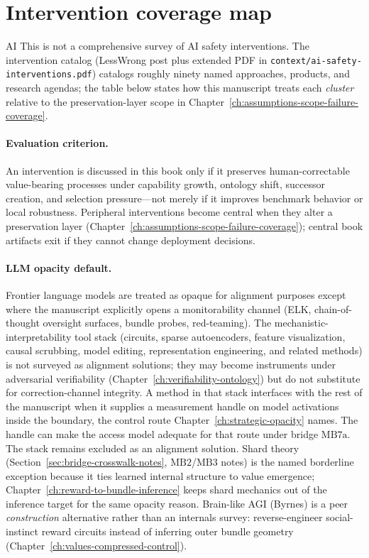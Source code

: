 \section{Intervention coverage map}
\label{sec:intervention-coverage-map}
\begin{authbar}{AI}
This is not a comprehensive survey of AI safety interventions.
The intervention catalog \autocite{zarncke2025interventions} (LessWrong post plus extended PDF in \texttt{context/ai-safety-interventions.pdf}) catalogs roughly ninety named approaches, products, and research agendas; the table below states how this manuscript treats each \emph{cluster} relative to the preservation-layer scope in Chapter~\ref{ch:assumptions-scope-failure-coverage}.

\paragraph{Evaluation criterion.}
An intervention is discussed in this book only if it preserves human-correctable value-bearing processes under capability growth, ontology shift, successor creation, and selection pressure---not merely if it improves benchmark behavior or local robustness.
Peripheral interventions become central when they alter a preservation layer (Chapter~\ref{ch:assumptions-scope-failure-coverage}); central book artifacts exit if they cannot change deployment decisions.

\paragraph{LLM opacity default.}
Frontier language models are treated as opaque for alignment purposes except where the manuscript explicitly opens a monitorability channel (ELK, chain-of-thought oversight surfaces, bundle probes, red-teaming).
The mechanistic-interpretability tool stack (circuits, sparse autoencoders, feature visualization, causal scrubbing, model editing, representation engineering, and related methods) is not surveyed as alignment solutions; they may become instruments under adversarial verifiability (Chapter~\ref{ch:verifiability-ontology}) but do not substitute for correction-channel integrity.
A method in that stack interfaces with the rest of the manuscript when it supplies a measurement handle on model activations inside the boundary, the control route Chapter~\ref{ch:strategic-opacity} names.
The handle can make the access model adequate for that route under bridge \(\text{MB7a}\).
The stack remains excluded as an alignment solution.
Shard theory (Section~\ref{sec:bridge-crosswalk-notes}, \(\text{MB2}\)/\(\text{MB3}\) notes) is the named borderline exception because it ties learned internal structure to value emergence; Chapter~\ref{ch:reward-to-bundle-inference} keeps shard mechanics out of the inference target for the same opacity reason.
Brain-like AGI (Byrnes) is a peer \emph{construction} alternative rather than an internals survey: reverse-engineer social-instinct reward circuits instead of inferring outer bundle geometry (Chapter~\ref{ch:values-compressed-control}).

\renewcommand{\arraystretch}{1.15}
\end{authbar}

